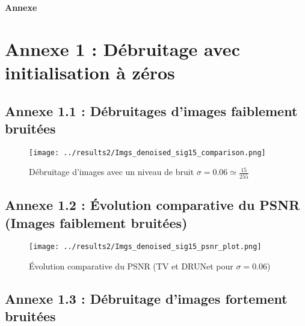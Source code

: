 \documentclass[a4paper, 12pt]{report} %
\begin{document}
\newpage

\vspace*{\fill}
\begin{center}
    {\fontsize{50}{60}\selectfont \textbf{Annexe}}
\end{center}
\vspace*{\fill}

\newpage
\section*{Annexe 1 : Débruitage avec initialisation à zéros}
\subsection*{Annexe 1.1 : Débruitages d'images faiblement bruitées}

\begin{figure}[H]
\centering
\begin{adjustbox}{width=1\linewidth, totalheight=0.48 \textheight, angle=0, scale= 0.72, minipage= 4.2\linewidth, margin= 0}
\texttt{[image: ../results2/Imgs\_denoised\_sig15\_comparison.png]}
\end{adjustbox}

\caption{Débruitage d'images avec un niveau de bruit $\sigma = 0.06 \simeq \frac{15}{255}$} 
    \label{fig:20}
\end{figure}

\subsection*{Annexe 1.2 : Évolution comparative du PSNR (Images faiblement bruitées)}

\begin{figure}[H]
\centering
\begin{adjustbox}{width=1\linewidth, totalheight=0.48 \textheight, angle=0, scale= 0.72, minipage= 4.2\linewidth, margin= 0}
\texttt{[image: ../results2/Imgs\_denoised\_sig15\_psnr\_plot.png]}
\end{adjustbox}
\caption{Évolution comparative du PSNR (TV et DRUNet pour $\sigma = 0.06$)} 
    \label{fig:21}
\end{figure} 

\subsection*{Annexe 1.3 : Débruitage d'images fortement bruitées}
\end{document}
